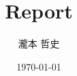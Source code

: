 \documentclass[uplatex, 10pt]{jsarticle}
\begin{document}
\title{Report}
\author{瀧本 哲史}
\date{\today}
\maketitle
\end{document}
